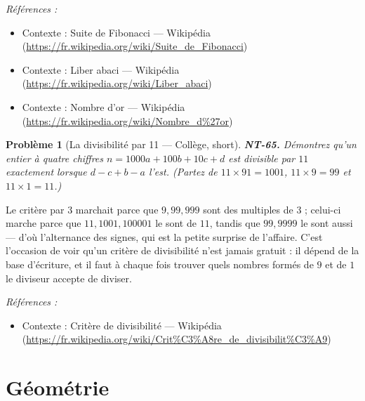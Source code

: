 \documentclass[11pt]{article}
\newtheorem{problem}{Problème}
\newenvironment{refs}{\par\small\noindent\emph{Références :}\begin{itemize}\setlength\itemsep{0pt}}{\end{itemize}\normalsize}
\begin{document}
\begin{refs}
\item Contexte : Suite de Fibonacci --- Wikipédia (\url{https://fr.wikipedia.org/wiki/Suite_de_Fibonacci})
\item Contexte : Liber abaci --- Wikipédia (\url{https://fr.wikipedia.org/wiki/Liber_abaci})
\item Contexte : Nombre d'or --- Wikipédia (\url{https://fr.wikipedia.org/wiki/Nombre_d%27or})
\end{refs}

\bigskip

\begin{problem}[{La divisibilité par 11 --- Collège, short}]
\textbf{NT-65.} Démontrez qu'un entier à quatre chiffres
$ n = 1000a + 100b + 10c + d $ est divisible par $ 11 $ exactement lorsque $ d - c + b - a $
l'est. (Partez de $ 11 \times 91 = 1001 $, $ 11 \times 9 = 99 $ et $ 11 \times 1 = 11 $.)
\end{problem}

\noindent Le critère par $ 3 $ marchait parce que $ 9, 99, 999 $ sont des multiples de
$ 3 $ ; celui-ci marche parce que $ 11, 1001, 100001 $ le sont de $ 11 $, tandis que
$ 99, 9999 $ le sont aussi --- d'où l'alternance des signes, qui est la petite surprise de l'affaire.
C'est l'occasion de voir qu'un critère de divisibilité n'est jamais gratuit : il dépend de la base
d'écriture, et il faut à chaque fois trouver quels nombres formés de $ 9 $ et de $ 1 $ le diviseur
accepte de diviser.

\begin{refs}
\item Contexte : Critère de divisibilité --- Wikipédia (\url{https://fr.wikipedia.org/wiki/Crit%C3%A8re_de_divisibilit%C3%A9})
\end{refs}

\bigskip


\section*{Géométrie}
\end{document}
